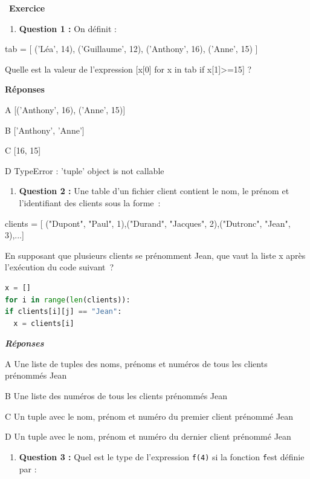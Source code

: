 \documentclass[
  11pt,
]{article}
\newcommand{\passthrough}[1]{#1}
\providecommand{\tightlist}{%
  \setlength{\itemsep}{0pt}\setlength{\parskip}{0pt}}
\newcounter{exo}
\newenvironment{exercice}[1]
{\par \medskip   \addtocounter{exo}{1} \noindent  
\begin{bclogo}[arrondi =0.1,   noborder = true, logo=\bccrayon, marge=4]{~\textbf{Exercice} \textbf{\theexo} {\itshape #1} }  \par}
{
\end{bclogo}
 \par \bigskip }
\newcounter{def}
\begin{document}
\begin{exercice}{}

\begin{enumerate}
\def\labelenumi{\arabic{enumi}.}
\tightlist
\item
  \textbf{Question 1 :} On définit :
\end{enumerate}

tab = {[} ('Léa', 14), ('Guillaume', 12), ('Anthony', 16), ('Anne', 15)
{]}

Quelle est la valeur de l'expression {[}x{[}0{]} for x in tab if
x{[}1{]}\textgreater=15{]} ?

\textbf{Réponses}

A {[}('Anthony', 16), ('Anne', 15){]}

B {[}'Anthony', 'Anne'{]}

C {[}16, 15{]}

D TypeError : 'tuple' object is not callable

\begin{enumerate}
\def\labelenumi{\arabic{enumi}.}
\setcounter{enumi}{1}
\tightlist
\item
  \textbf{Question 2 :} Une table d'un fichier client contient le nom,
  le prénom et l'identifiant des clients sous la forme~:
\end{enumerate}

clients = {[} ("Dupont", "Paul", 1),("Durand", "Jacques", 2),("Dutronc",
"Jean", 3),...{]}

En supposant que plusieurs clients se prénomment Jean, que vaut la liste
x après l'exécution du code suivant~?

\begin{lstlisting}[language=Python]
x = []
for i in range(len(clients)):
if clients[i][j] == "Jean":
  x = clients[i]
\end{lstlisting}

\textbf{\emph{Réponses}}

A Une liste de tuples des noms, prénoms et numéros de tous les clients
prénommés Jean

B Une liste des numéros de tous les clients prénommés Jean

C Un tuple avec le nom, prénom et numéro du premier client prénommé Jean

D Un tuple avec le nom, prénom et numéro du dernier client prénommé Jean

\begin{enumerate}
\def\labelenumi{\arabic{enumi}.}
\setcounter{enumi}{2}
\tightlist
\item
  \textbf{Question 3 :} Quel est le type de l'expression
  \passthrough{\lstinline!f(4)!} si la fonction
  \passthrough{\lstinline!f!}est définie par :
\end{enumerate}


\end{exercice}
\end{document}
